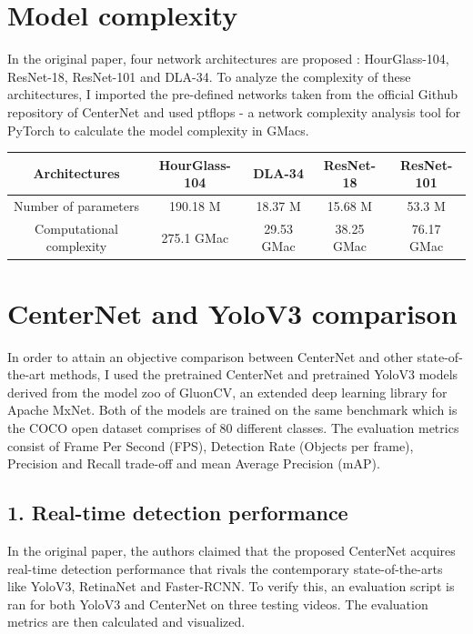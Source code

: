 \documentclass[12pt]{article}
\begin{document}
\section*{Model complexity}
In the original paper, four network architectures are proposed : HourGlass-104, ResNet-18, ResNet-101 and DLA-34. To analyze the complexity of these architectures, I imported the pre-defined networks taken from the official Github repository of CenterNet and used ptflops - a network complexity analysis tool for PyTorch to calculate the model complexity in GMacs.
\begin{center}
\begin{tabular}{ |c|c|c|c|c| } 
\hline
Architectures & HourGlass-104 & DLA-34 & ResNet-18 & ResNet-101 \\
\hline
Number of parameters & 190.18 M & 18.37 M & 15.68 M & 53.3 M \\ 
Computational complexity & 275.1 GMac & 29.53 GMac & 38.25 GMac & 76.17 GMac \\ 
\hline
\end{tabular}
\end{center}


\section*{CenterNet and YoloV3 comparison}
In order to attain an objective comparison between CenterNet and other state-of-the-art methods, I used the pretrained CenterNet and pretrained YoloV3 models derived from the model zoo of GluonCV, an extended deep learning library for Apache MxNet. Both of the models are trained on the same benchmark which is the COCO open dataset comprises of 80 different classes. The evaluation metrics consist of Frame Per Second (FPS), Detection Rate (Objects per frame), Precision and Recall trade-off and mean Average Precision (mAP).\newpage

\subsection*{1. Real-time detection performance}
In the original paper, the authors claimed that the proposed CenterNet acquires real-time detection performance that rivals the contemporary state-of-the-arts like YoloV3, RetinaNet and Faster-RCNN. To verify this, an evaluation script is ran for both YoloV3 and CenterNet on three testing videos. The evaluation metrics are then calculated and visualized.\newline
\end{document}
